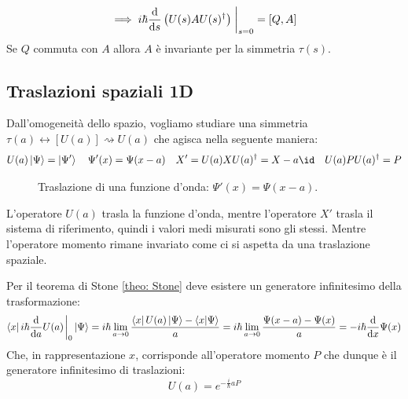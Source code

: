 \begin{equation}\label{eq: simmetria}
    \implies  i\hbar \dv{}{s}\left( U(s)AU(s)^\dagger \right)\eval_{s=0} = \left[ Q, A \right]
\end{equation}
Se \(Q\) commuta con \(A\) allora \(A\) è invariante per la simmetria \(\tau(s )\).


\subsection{Traslazioni spaziali 1D}
Dall'omogeneità dello spazio, vogliamo studiare una simmetria \(\tau(a) \leftrightarrow \left[ U(a) \right]\rightsquigarrow U(a)\) che agisca nella seguente maniera:
\[
    U(a)\ket{\Psi}= \ket{\Psi'} \quad \Psi'(x)= \Psi(x-a) \quad X' = U(a)XU(a)^\dagger = X- a\id \quad U(a)P U(a)^\dagger = P
\]


\begin{figure}[h]
    \centering
    \caption{Traslazione di una funzione d'onda: $\Psi'(x)=\Psi(x-a)$.}
    \label{fig:traslazione-1d}
\end{figure}

L'operatore \(U(a)\) trasla la funzione d'onda, mentre l'operatore \(X'\) trasla il sistema di riferimento,
quindi i valori medi misurati sono gli stessi. 
Mentre l'operatore momento rimane invariato come ci si aspetta da una traslazione spaziale.

Per il teorema di Stone \ref{theo: Stone} deve esistere un generatore infinitesimo della trasformazione:
\[
    \bra{x} i\hbar\dv{a}U(a)\eval_{0}\ket{\Psi}= i\hbar \lim_{a\to 0 }   \frac{\bra{x}U(a)\ket{\Psi}-\braket{x}{\Psi}}{a}= i\hbar\lim_{a\to0 }\frac{\Psi(x-a)-\Psi(x)}{a} = -i\hbar \dv{x}\Psi(x)
\]
Che, in rappresentazione \(x\), corrisponde all'operatore momento \(P\) che dunque è il generatore infinitesimo di traslazioni:
\begin{equation}
    U(a) = e^{-\frac{i}{\hbar}aP}
\end{equation}


